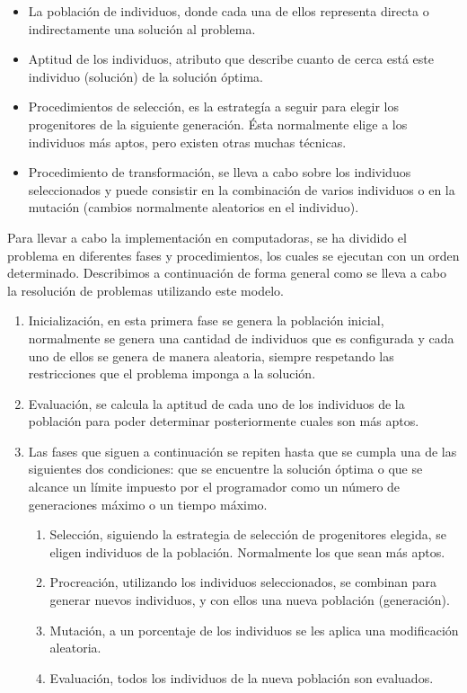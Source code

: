 \begin{itemize}
	\item La población de individuos, donde cada una de ellos representa directa o indirectamente una solución al problema.
	\item Aptitud de los individuos, atributo que describe cuanto de cerca est\'a este individuo (solución) de la solución \'optima. 
	\item Procedimientos de selección, es la estrateg\'ia a seguir para elegir los progenitores de la siguiente generaci\'on. \'Esta normalmente elige a los individuos m\'as aptos, pero existen otras muchas técnicas.
	\item Procedimiento de transformaci\'on, se lleva a cabo sobre los individuos seleccionados y puede consistir en la combinación de varios individuos o en la mutación (cambios normalmente aleatorios en el individuo).
\end{itemize}

Para llevar a cabo la implementación en computadoras, se ha dividido el problema en diferentes fases y procedimientos, los cuales se ejecutan con un orden determinado. Describimos a continuación de forma general como se lleva a cabo la resolución de problemas utilizando este modelo.

\begin{enumerate}
	\item Inicializaci\'on, en esta primera fase se genera la población inicial, normalmente se genera una cantidad de individuos que es configurada y cada uno de ellos se genera de manera aleatoria, siempre respetando las restricciones que el problema imponga a la solución.
	\item Evaluaci\'on, se calcula la aptitud de cada uno de los individuos de la población para poder determinar posteriormente cuales son m\'as aptos.
	\item Las fases que siguen a continuación se repiten hasta que se cumpla una de las siguientes dos condiciones: que se encuentre la solución \'optima o que se alcance un l\'imite impuesto por el programador como un n\'umero de generaciones máximo o un tiempo máximo.
	\begin{enumerate}
		\item Selección, siguiendo la estrategia de selección de progenitores elegida, se eligen individuos de la población. Normalmente los que sean m\'as aptos.
		\item Procreaci\'on, utilizando los individuos seleccionados, se combinan para generar nuevos individuos, y con ellos una nueva población (generación).
		\item Mutaci\'on, a un porcentaje de los individuos se les aplica una modificación aleatoria.
		\item Evaluaci\'on, todos los individuos de la nueva poblaci\'on son evaluados.
	\end{enumerate}
\end{enumerate}

